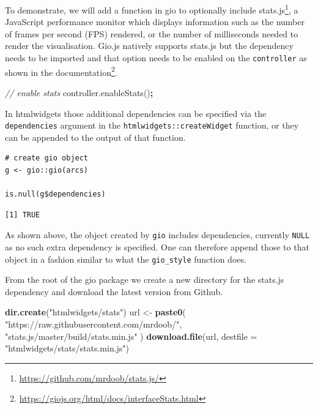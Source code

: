 \documentclass[
]{krantz}
\makeatletter
\newenvironment{Shaded}{\begin{snugshade}}{\end{snugshade}}
\newcommand{\AttributeTok}[1]{\textcolor[rgb]{0.61,0.61,0.61}{#1}}
\newcommand{\CommentTok}[1]{\textcolor[rgb]{0.37,0.37,0.37}{\textit{#1}}}
\newcommand{\DataTypeTok}[1]{\textcolor[rgb]{0.27,0.27,0.27}{#1}}
\newcommand{\KeywordTok}[1]{\textcolor[rgb]{0.27,0.27,0.27}{\textbf{#1}}}
\newcommand{\NormalTok}[1]{#1}
\newcommand{\OperatorTok}[1]{\textcolor[rgb]{0.43,0.43,0.43}{\textbf{#1}}}
\newcommand{\StringTok}[1]{\textcolor[rgb]{0.5,0.5,0.5}{#1}}
\newcommand{\VariableTok}[1]{\textcolor[rgb]{0,0,0}{#1}}
\renewcommand{\href}[2]{#2\footnote{\url{#1}}}
\newenvironment{kframe}{%
\medskip{}
\setlength{\fboxsep}{.8em}
 \def\at@end@of@kframe{}%
 \ifinner\ifhmode%
  \def\at@end@of@kframe{\end{minipage}}%
  \begin{minipage}{\columnwidth}%
 \fi\fi%
 \def\FrameCommand##1{\hskip\@totalleftmargin \hskip-\fboxsep
 \colorbox{shadecolor}{##1}\hskip-\fboxsep
     \hskip-\linewidth \hskip-\@totalleftmargin \hskip\columnwidth}%
 \MakeFramed {\advance\hsize-\width
   \@totalleftmargin\z@ \linewidth\hsize
   \@setminipage}}%
 {\par\unskip\endMakeFramed%
 \at@end@of@kframe}
\renewenvironment{Shaded}{\begin{kframe}}{\end{kframe}}
\makeatother
\begin{document}
To demonstrate, we will add a function in gio to optionally include \href{https://github.com/mrdoob/stats.js/}{stats.js}, a JavaScript performance monitor which displays information such as the number of frames per second (FPS) rendered, or the number of milliseconds needed to render the visualisation. Gio.js natively supports stats.js but the dependency needs to be imported and that option needs to be enabled on the \texttt{controller} as shown in the \href{https://giojs.org/html/docs/interfaceStats.html}{documentation}.

\begin{Shaded}
\begin{Highlighting}[]
\CommentTok{// enable stats}
\VariableTok{controller}\NormalTok{.}\AttributeTok{enableStats}\NormalTok{()}\OperatorTok{;}
\end{Highlighting}
\end{Shaded}

In htmlwidgets those additional dependencies can be specified via the \texttt{dependencies} argument in the \texttt{htmlwidgets::createWidget} function, or they can be appended to the output of that function.

\begin{verbatim}
# create gio object
g <- gio::gio(arcs)

is.null(g$dependencies)
\end{verbatim}

\begin{verbatim}
[1] TRUE
\end{verbatim}

As shown above, the object created by \texttt{gio} includes dependencies, currently \texttt{NULL} as no such extra dependency is specified. One can therefore append those to that object in a fashion similar to what the \texttt{gio\_style} function does.

From the root of the gio package we create a new directory for the stats.js dependency and download the latest version from Github.

\begin{Shaded}
\begin{Highlighting}[]
\KeywordTok{dir.create}\NormalTok{(}\StringTok{"htmlwidgets/stats"}\NormalTok{)}
\NormalTok{url <{-}}\StringTok{ }\KeywordTok{paste0}\NormalTok{(}
  \StringTok{"https://raw.githubusercontent.com/mrdoob/"}\NormalTok{,}
  \StringTok{"stats.js/master/build/stats.min.js"}
\NormalTok{)}
\KeywordTok{download.file}\NormalTok{(url, }\DataTypeTok{destfile =} \StringTok{"htmlwidgets/stats/stats.min.js"}\NormalTok{)}
\end{Highlighting}
\end{Shaded}
\end{document}
